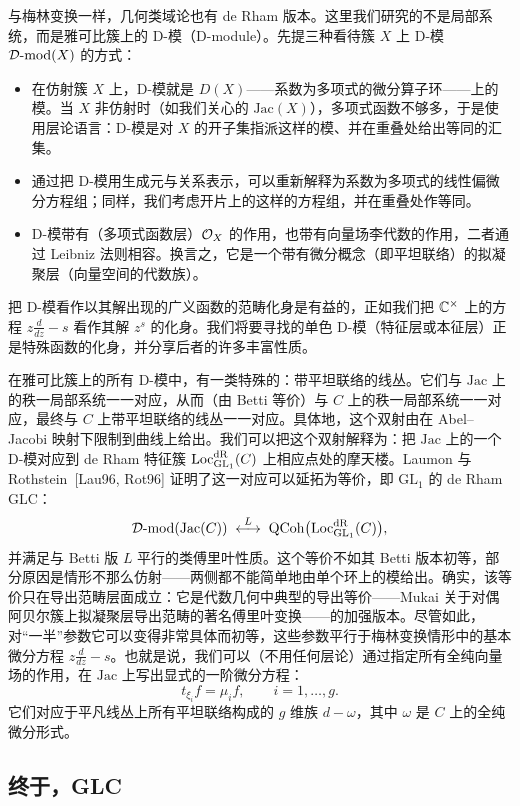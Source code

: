 与梅林变换一样，几何类域论也有 de Rham 版本。这里我们研究的不是局部系统，而是雅可比簇上的 D-模（D-module）。先提三种看待簇 $X$ 上 D-模 $\mathcal{D}\text{-}\mathrm{mod}(X)$ 的方式：

\begin{itemize}
\item 在仿射簇 $X$ 上，D-模就是 $D(X)$——系数为多项式的微分算子环——上的模。当 $X$ 非仿射时（如我们关心的 $\mathrm{Jac}(X)$），多项式函数不够多，于是使用层论语言：D-模是对 $X$ 的开子集指派这样的模、并在重叠处给出等同的汇集。
\item 通过把 D-模用生成元与关系表示，可以重新解释为系数为多项式的线性偏微分方程组；同样，我们考虑开片上的这样的方程组，并在重叠处作等同。
\item D-模带有（多项式函数层）$\mathcal{O}_{X}$ 的作用，也带有向量场李代数的作用，二者通过 Leibniz 法则相容。换言之，它是一个带有微分概念（即平坦联络）的拟凝聚层（向量空间的代数族）。
\end{itemize}

把 D-模看作以其解出现的广义函数的范畴化身是有益的，正如我们把 $\mathbb{C}^{\times}$ 上的方程 $z\frac{d}{dz}-s$ 看作其解 $z^{s}$ 的化身。我们将要寻找的单色 D-模（特征层或本征层）正是特殊函数的化身，并分享后者的许多丰富性质。

在雅可比簇上的所有 D-模中，有一类特殊的：带平坦联络的线丛。它们与 $\mathrm{Jac}$ 上的秩一局部系统一一对应，从而（由 Betti 等价）与 $C$ 上的秩一局部系统一一对应，最终与 $C$ 上带平坦联络的线丛一一对应。具体地，这个双射由在 Abel–Jacobi 映射下限制到曲线上给出。我们可以把这个双射解释为：把 $\mathrm{Jac}$ 上的一个 D-模对应到 de Rham 特征簇 $\operatorname{Loc}^{\mathrm{dR}}_{\mathrm{GL}_{1}}(C)$ 上相应点处的摩天楼。Laumon 与 Rothstein~[Lau96, Rot96] 证明了这一对应可以延拓为等价，即 $\mathrm{GL}_{1}$ 的 de Rham GLC：
\[
\mathcal{D}\text{-}\mathrm{mod}(\mathrm{Jac}(C))\;\overset{L}{\longleftrightarrow}\;\operatorname{QCoh}\bigl(\operatorname{Loc}^{\mathrm{dR}}_{\mathrm{GL}_{1}}(C)\bigr),
\]
并满足与 Betti 版 $L$ 平行的类傅里叶性质。这个等价不如其 Betti 版本初等，部分原因是情形不那么仿射——两侧都不能简单地由单个环上的模给出。确实，该等价只在导出范畴层面成立：它是代数几何中典型的导出等价——Mukai 关于对偶阿贝尔簇上拟凝聚层导出范畴的著名傅里叶变换——的加强版本。尽管如此，对“一半”参数它可以变得非常具体而初等，这些参数平行于梅林变换情形中的基本微分方程 $z\frac{d}{dz}-s$。也就是说，我们可以（不用任何层论）通过指定所有全纯向量场的作用，在 $\mathrm{Jac}$ 上写出显式的一阶微分方程：
\[
t_{\xi_{i}}f=\mu_{i}f,\qquad i=1,\dots,g.
\]
它们对应于平凡线丛上所有平坦联络构成的 $g$ 维族 $d-\omega$，其中 $\omega$ 是 $C$ 上的全纯微分形式。

\subsection{终于，GLC}\label{sec:2.5}

